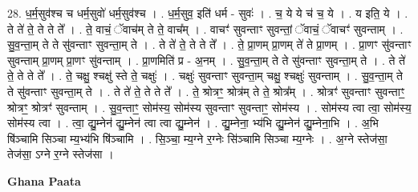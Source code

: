 \documentclass[17pt]{extarticle}
\begin{document}
28. ध॒र्म॒सुव॑श्च च धर्म॒सुवो॑ धर्म॒सुव॑श्च । . ध॒र्म॒सुव॒ इति॑ धर्म - सुवः॑ । . च॒ ये ये च॑ च॒ ये । . य इति॒ ये । . ते ते॑ ते॒ ते ते ते᳚ । . ते॒ वाचं॒ ॅवाच॑म् ते ते॒ वाच᳚म् । . वाचꣳ॑ सुवन्ताꣳ सुवन्तां॒ ॅवाचं॒ ॅवाचꣳ॑ सुवन्ताम् । . सु॒व॒न्ता॒म् ते ते सु॑वन्ताꣳ सुवन्ता॒म् ते । . ते ते॑ ते॒ ते ते ते᳚ । . ते॒ प्रा॒णम् प्रा॒णम् ते॑ ते प्रा॒णम् । . प्रा॒णꣳ सु॑वन्ताꣳ सुवन्ताम् प्रा॒णम् प्रा॒णꣳ सु॑वन्ताम् । . प्रा॒णमिति॑ प्र - अ॒नम् । . सु॒व॒न्ता॒म् ते ते सु॑वन्ताꣳ सुवन्ता॒म् ते । . ते ते॑ ते॒ ते ते ते᳚ । . ते॒ चक्षु॒ श्चक्षु॑ स्ते ते॒ चक्षुः॑ । . चक्षुः॑ सुवन्ताꣳ सुवन्ता॒म् चक्षु॒ श्चक्षुः॑ सुवन्ताम् । . सु॒व॒न्ता॒म् ते ते सु॑वन्ताꣳ सुवन्ता॒म् ते । . ते ते॑ ते॒ ते ते ते᳚ । . ते॒ श्रोत्रꣳ॒॒ श्रोत्र॑म् ते ते॒ श्रोत्र᳚म् । . श्रोत्रꣳ॑ सुवन्ताꣳ सुवन्ताꣳ॒॒ श्रोत्रꣳ॒॒ श्रोत्रꣳ॑ सुवन्ताम् । . सु॒व॒न्ताꣳ॒॒ सोम॑स्य॒ सोम॑स्य सुवन्ताꣳ सुवन्ताꣳ॒॒ सोम॑स्य । . सोम॑स्य त्वा त्वा॒ सोम॑स्य॒ सोम॑स्य त्वा । . त्वा॒ द्यु॒म्नेन॑ द्यु॒म्नेन॑ त्वा त्वा द्यु॒म्नेन॑ । . द्यु॒म्नेना॒ भ्य॑भि द्यु॒म्नेन॑ द्यु॒म्नेना॒भि । . अ॒भि षि॑ञ्चामि सिञ्चा म्य॒भ्य॑भि षि॑ञ्चामि । . सि॒ञ्चा॒ म्य॒ग्ने र॒ग्नेः सि॑ञ्चामि सिञ्चा म्य॒ग्नेः । . अ॒ग्ने स्तेज॑सा॒ तेज॑सा॒ ऽग्ने र॒ग्ने स्तेज॑सा । \newline

\textbf{Ghana Paata } \newline
\end{document}
